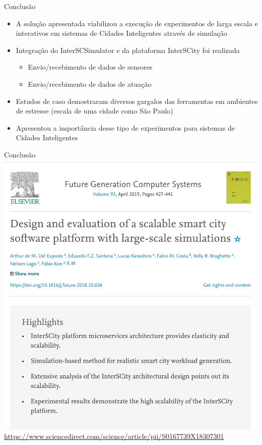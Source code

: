 \documentclass[xcolor={usenames,svgnames,dvipsnames},brazil,english,12pt,aspectratio=149]{beamer}
\begin{document}
\begin{frame}{Conclusão}
    \begin{itemize}
        \item A solução apresentada viabilizou a execução de experimentos de larga escala e interativos em sistemas de Cidades Inteligentes através de simulação
        \item Integração do InterSCSimulator e da plataforma InterSCity foi realizada
            \begin{itemize}
                \item Envio/recebimento de dados de sensores
                \item Envio/recebimento de dados de atuação
            \end{itemize}
        \item Estudos de caso demostraram diversos gargalos das ferramentas em ambientes de estresse (escala de uma cidade como São Paulo)
        \item Apresentou a importância desse tipo de experimentos para sistemas de Cidades Inteligentes
    \end{itemize}
\end{frame}

\begin{frame}{Conclusão}
    \centering
    \includegraphics[width=.5\textwidth]{paper.png}
    { \tiny \url{https://www.sciencedirect.com/science/article/pii/S0167739X18307301} }
\end{frame}
\end{document}

